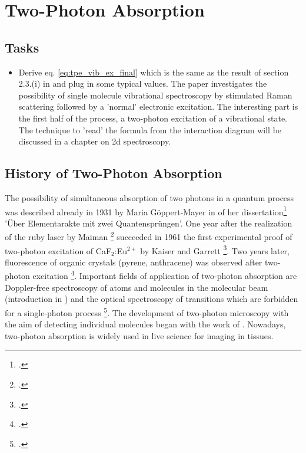 \chapter{Two-Photon Absorption}


\section{Tasks}

\begin{itemize}
\item Derive eq. \ref{eq:tpe_vib_ex_final} which is the same as the result of section 2.3.(i) in \cite{Winterhalder11} and plug in some typical values. The paper investigates the possibility of single molecule vibrational spectroscopy by stimulated Raman scattering followed by a 'normal' electronic excitation. The interesting part is the first half of the process, a two-photon excitation of a vibrational state. The technique to 'read' the formula from the interaction diagram will be discussed in a chapter on 2d spectroscopy.
\end{itemize}



\section{History of Two-Photon Absorption}

The possibility of simultaneous absorption of two photons in
a quantum process was  described already  in 1931  by Maria Göppert-Mayer in
of her dissertation\footcite[About elementary acts with two quantum jumps]{goeppert31}  'Über Elementarakte mit zwei Quantensprüngen'. One year
after the realization of the ruby laser by Maiman
\footcite{maiman60} succeeded in 1961 the first experimental proof of
two-photon excitation of CaF$_2$:Eu$^{2+}$ by Kaiser and
Garrett \footcite{Kaiser61}. Two years later, fluorescence of 
organic crystals (pyrene, anthracene) was observed after 
two-photon excitation  \footcite{peticolas63}.  Important
fields of application of two-photon absorption are
Doppler-free spectroscopy of atoms and molecules in the
molecular beam (introduction in 
\cite{Demtroeder_laser}) and the optical
spectroscopy of transitions which are forbidden for a single-photon process \footcite{birge86}. The development of 
two-photon microscopy with the aim of detecting individual
molecules began with the work of  \cite{denk90}. Nowadays, two-photon absorption is widely used in live science for imaging in tissues.





